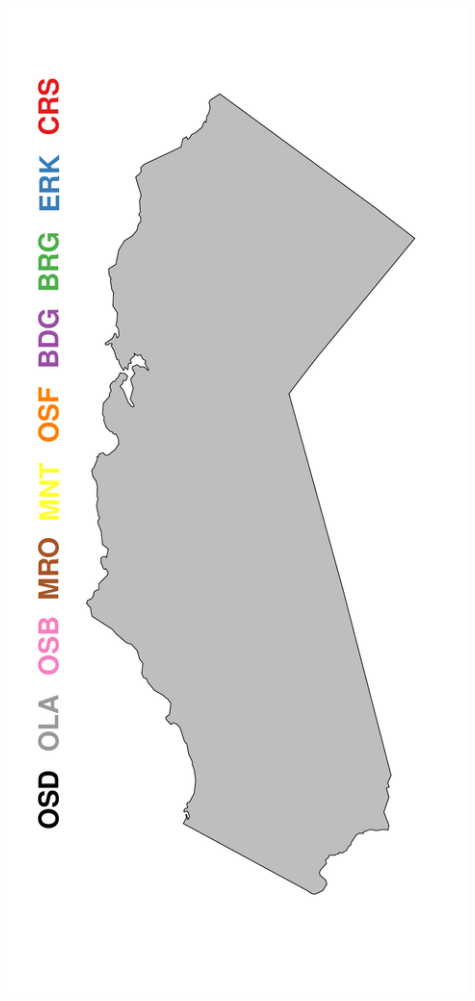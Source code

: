 \documentclass[a0paper,portrait]{baposter}
\begin{document}
\begin{poster}
{\begin{minipage}[h!]{0.19\textwidth}
	        \includegraphics[width=0.91\textwidth]{../pictures/mapFullSparse.pdf}
	\end{minipage}
}


\end{poster}
\end{document}
